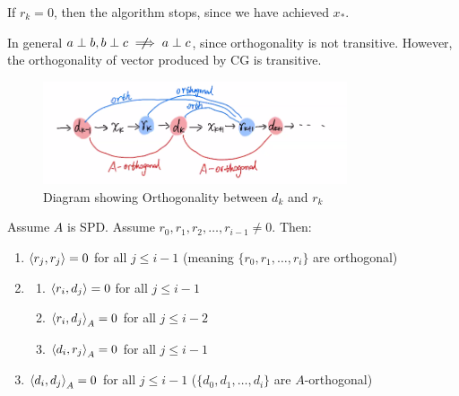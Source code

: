 \documentclass[../main/main.tex]{subfiles}
\begin{document}
    \begin{remark}
If $r_{k}=0$, then the algorithm stops, since we have achieved $x_{*}$.
    \end{remark}
    In general $a\perp b, b\perp c\centernot\implies a\perp c$, since orthogonality is not transitive. However, the orthogonality of vector produced by CG is transitive.
    \begin{figure}[htpb]
      \centering
      \includegraphics[width=0.8\textwidth]{../images/3-11-orth.png}
      \caption{Diagram showing Orthogonality between $d_{k}$ and $r_{k}$ }
    \end{figure}
    \begin{theorem}
      Assume $A$ is SPD. Assume $r_{0},r_1,r_2, \ldots ,r_{i-1}\neq 0$. Then:
      \begin{enumerate}
\item $\left\langle{r_{j}},{r_{j}}\right\rangle = 0$ for all $j\leq  i-1$ (meaning $\{r_{0},r_{1}, \ldots , r_{i}\}$ are orthogonal)
        \item
              \begin{enumerate}
\item $\left\langle{r_{i}},{d_{j}}\right\rangle=0$ for all $j\leq  i-1$
\item $\left\langle{r_{i}},{d_{j}}\right\rangle_{A}=0$ for all $j\leq  i-2$
\item $\left\langle{d_{i}},{r_{j}}\right\rangle_{A}=0$ for all $j\leq  i-1$
              \end{enumerate}
              \item $\left\langle{d_{i}},{d_{j}}\right\rangle_{A}=0$ for all $j\leq i-1$ ($\{d_{0},d_{1}, \ldots , d_{i}\}$ are $A$-orthogonal)
      \end{enumerate}
    \end{theorem}
\end{document}
